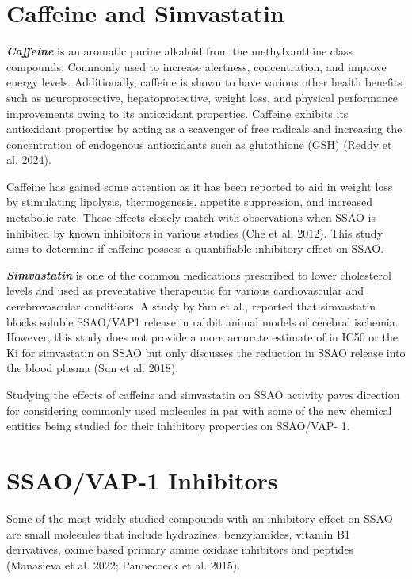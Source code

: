\documentclass[
  letterpaper,
  DIV=11,
  numbers=noendperiod]{scrreprt}
\begin{document}
\section{\texorpdfstring{\textbf{Caffeine and
Simvastatin}}{Caffeine and Simvastatin}}\label{caffeine-and-simvastatin}

\textbf{\emph{Caffeine}} is an aromatic purine alkaloid from the
methylxanthine class compounds. Commonly used to increase alertness,
concentration, and improve energy levels. Additionally, caffeine is
shown to have various other health benefits such as neuroprotective,
hepatoprotective, weight loss, and physical performance improvements
owing to its antioxidant properties. Caffeine exhibits its antioxidant
properties by acting as a scavenger of free radicals and increasing the
concentration of endogenous antioxidants such as glutathione (GSH)
(Reddy et al. 2024).

Caffeine has gained some attention as it has been reported to aid in
weight loss by stimulating lipolysis, thermogenesis, appetite
suppression, and increased metabolic rate. These effects closely match
with observations when SSAO is inhibited by known inhibitors in various
studies (Che et al. 2012). This study aims to determine if caffeine
possess a quantifiable inhibitory effect on SSAO.

\textbf{\emph{Simvastatin}} is one of the common medications prescribed
to lower cholesterol levels and used as preventative therapeutic for
various cardiovascular and cerebrovascular conditions. A study by Sun et
al., reported that simvastatin blocks soluble SSAO/VAP1 release in
rabbit animal models of cerebral ischemia. However, this study does not
provide a more accurate estimate of in IC50 or the Ki for simvastatin on
SSAO but only discusses the reduction in SSAO release into the blood
plasma (Sun et al. 2018).

Studying the effects of caffeine and simvastatin on SSAO activity paves
direction for considering commonly used molecules in par with some of
the new chemical entities being studied for their inhibitory properties
on SSAO/VAP- 1.

\section{\texorpdfstring{\textbf{SSAO/VAP-1
Inhibitors}}{SSAO/VAP-1 Inhibitors}}\label{ssaovap-1-inhibitors}

Some of the most widely studied compounds with an inhibitory effect on
SSAO are small molecules that include hydrazines, benzylamides, vitamin
B1 derivatives, oxime based primary amine oxidase inhibitors and
peptides (Manasieva et al. 2022; Pannecoeck et al. 2015).
\end{document}
